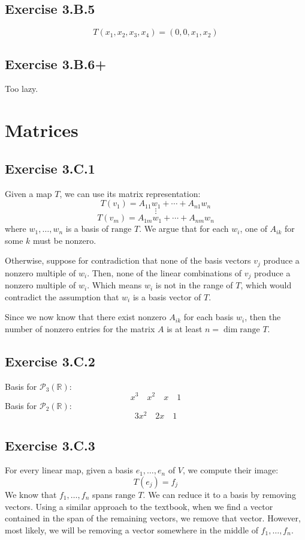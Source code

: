 \documentclass{book}
\begin{document}
\subsection*{Exercise 3.B.5}
$$T(x_1, x_2, x_3, x_4) = (0, 0, x_1, x_2)$$

\subsection*{Exercise 3.B.6+}
Too lazy.

\section{Matrices}

\subsection*{Exercise 3.C.1}
Given a map $T$, we can use its matrix representation:
$$T(v_1) = A_{11} w_1 + \cdots + A_{n1} w_n$$
$$\vdots$$
$$T(v_m) = A_{1m} w_1 + \cdots + A_{nm} w_n$$
where $w_1, \ldots, w_n$ is a basis of $\text{range } T$. We argue that for each $w_i$, one of $A_{ik}$ for some $k$ must be nonzero.

Otherwise, suppose for contradiction that none of the basis vectors $v_j$ produce a nonzero multiple of $w_i$. Then, none of the linear combinations of $v_j$ produce a nonzero multiple of $w_i$. Which means $w_i$ is not in the range of $T$, which would contradict the assumption that $w_i$ is a basis vector of $T$.

Since we now know that there exist nonzero $A_{ik}$ for each basis $w_i$, then the number of nonzero entries for the matrix $A$ is at least $n = \dim \text{range } T$.

\subsection*{Exercise 3.C.2}
Basis for $\mathcal{P}_3 (\mathbb{R})$:
$$x^3 \quad x^2 \quad x \quad 1$$
Basis for $\mathcal{P}_2 (\mathbb{R})$:
$$3x^2 \quad 2x \quad 1$$

\subsection*{Exercise 3.C.3}
For every linear map, given a basis $e_1, \ldots, e_n$ of $V$, we compute their image:
$$T(e_j) = f_j$$
We know that $f_1, \ldots, f_n$ spans $\text{range } T$. We can reduce it to a basis by removing vectors. Using a similar approach to the textbook, when we find a vector contained in the span of the remaining vectors, we remove that vector. However, most likely, we will be removing a vector somewhere in the middle of $f_1, \ldots, f_n$.
\end{document}
